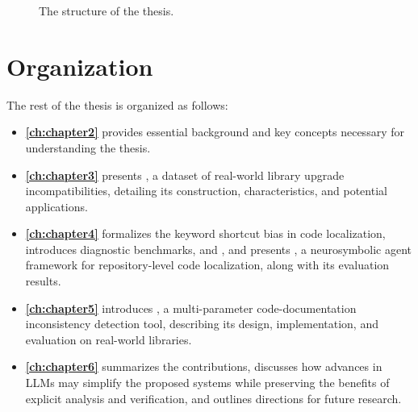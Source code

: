 \begin{figure}[htbp]
\caption{The structure of the thesis.}\label{fig:thesis_structure}
\end{figure}


\section{Organization}\label{sec:organization}
The rest of the thesis is organized as follows:

\begin{itemize}
  \item \hyperref[ch:chapter2]{\underline{\textbf{\cref{ch:chapter2}}}} provides essential background and key concepts necessary for understanding the thesis.
  \item \hyperref[ch:chapter3]{\underline{\textbf{\cref{ch:chapter3}}}} presents \toolcompsuite, a dataset of real-world library upgrade incompatibilities, detailing its construction, characteristics, and potential applications.
  \item \hyperref[ch:chapter4]{\underline{\textbf{\cref{ch:chapter4}}}} formalizes the keyword shortcut bias in code localization, introduces diagnostic benchmarks, \dataset and \negset, and presents \tooldataloc, a neurosymbolic agent framework for repository-level code localization, along with its evaluation results.
  \item \hyperref[ch:chapter5]{\underline{\textbf{\cref{ch:chapter5}}}} introduces \toolchecker, a multi-parameter code-documentation inconsistency detection tool, describing its design, implementation, and evaluation on real-world libraries.
  \item \hyperref[ch:chapter6]{\underline{\textbf{\cref{ch:chapter6}}}} summarizes the contributions, discusses how advances in LLMs may simplify the proposed systems while preserving the benefits of explicit analysis and verification, and outlines directions for future research.
\end{itemize}
